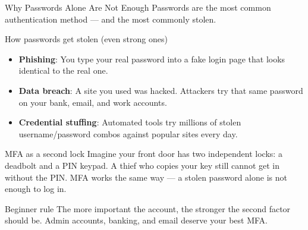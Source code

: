 \documentclass[aspectratio=169]{beamer}  %
\begin{document}
\begin{frame}{Why Passwords Alone Are Not Enough}
    \footnotesize
    Passwords are the most common authentication method --- and the most commonly stolen.

    \vspace{0.4em}
    \begin{alertblock}{How passwords get stolen (even strong ones)}
        \footnotesize
        \begin{itemize}
            \item \textbf{Phishing}: You type your real password into a fake login page that looks identical to the real one.
            \item \textbf{Data breach}: A site you used was hacked. Attackers try that same password on your bank, email, and work accounts.
            \item \textbf{Credential stuffing}: Automated tools try millions of stolen username/password combos against popular sites every day.
        \end{itemize}
    \end{alertblock}

    \vspace{0.3em}
    \begin{exampleblock}{MFA as a second lock}
        \footnotesize
        Imagine your front door has two independent locks: a deadbolt and a PIN keypad. A thief who copies your key still cannot get in without the PIN. MFA works the same way --- a stolen password alone is not enough to log in.
    \end{exampleblock}

    \begin{block}{Beginner rule}
        \footnotesize
        The more important the account, the stronger the second factor should be. Admin accounts, banking, and email deserve your best MFA.
    \end{block}
\end{frame}
\end{document}
